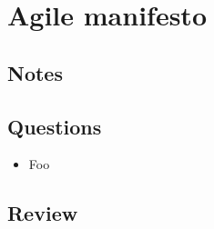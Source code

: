 \chapter{Agile manifesto \cite{agilemanifesto}}
\section{Notes}

\section{Questions}
\begin{itemize}
  \item Foo
\end{itemize}

\section{Review}

